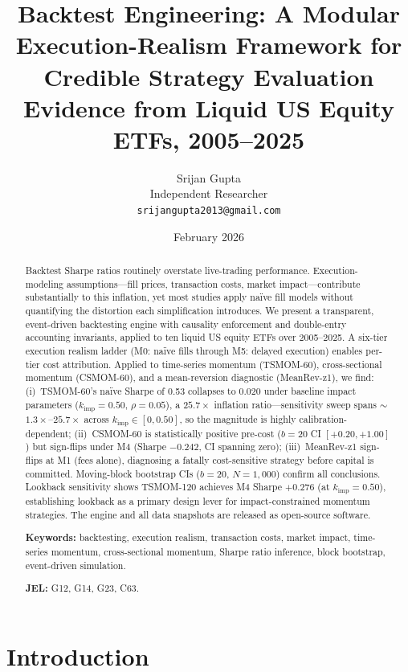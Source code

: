 \documentclass[12pt]{article}
\title{\textbf{Backtest Engineering: A Modular Execution-Realism
Framework for Credible Strategy Evaluation}\\[6pt]
\large\normalfont
Evidence from Liquid US Equity ETFs, 2005--2025}
\author{Srijan Gupta\\
  \small Independent Researcher\\
  \small \texttt{srijangupta2013@gmail.com}}
\date{February 2026}
\newcommand{\kimp}{k_{\mathrm{imp}}}
\begin{document}
\maketitle
\thispagestyle{empty}

\begin{abstract}
\noindent
Backtest Sharpe ratios routinely overstate live-trading performance.
Execution-modeling assumptions---fill prices, transaction costs, market
impact---contribute substantially to this inflation, yet most studies
apply na\"{i}ve fill models without quantifying the distortion each
simplification introduces. We present a transparent, event-driven
backtesting engine with causality enforcement and double-entry accounting
invariants, applied to ten liquid US equity ETFs over 2005--2025.
A six-tier execution realism ladder (M0: na\"{i}ve fills through
M5: delayed execution) enables per-tier cost attribution.
Applied to time-series momentum (TSMOM-60), cross-sectional momentum
(CSMOM-60), and a mean-reversion diagnostic (MeanRev-z1), we find:
(i)~TSMOM-60's na\"{i}ve Sharpe of 0.53 collapses to 0.020 under
baseline impact parameters ($\kimp=0.50$, $\rho=0.05$), a $25.7\times$
inflation ratio---sensitivity sweep spans $\sim$$1.3\times$--$25.7\times$
across $\kimp \in [0, 0.50]$, so the magnitude is highly
calibration-dependent;
(ii)~CSMOM-60 is statistically positive pre-cost ($b=20$ CI $[+0.20,
+1.00]$) but sign-flips under M4 (Sharpe $-0.242$, CI spanning zero);
(iii)~MeanRev-z1 sign-flips at M1 (fees alone), diagnosing a fatally
cost-sensitive strategy before capital is committed.
Moving-block bootstrap CIs ($b=20$, $N=1{,}000$) confirm all conclusions.
Lookback sensitivity shows TSMOM-120 achieves M4 Sharpe $+0.276$
(at $\kimp=0.50$), establishing lookback as a primary design lever for
impact-constrained momentum strategies.
The engine and all data snapshots are released as open-source software.

\medskip\noindent
\textbf{Keywords:} backtesting, execution realism, transaction costs,
market impact, time-series momentum, cross-sectional momentum, Sharpe
ratio inference, block bootstrap, event-driven simulation.

\medskip\noindent
\textbf{JEL:} G12, G14, G23, C63.
\end{abstract}

\newpage\setcounter{page}{1}\onehalfspacing

\section{Introduction}
\label{sec:intro}
\end{document}
